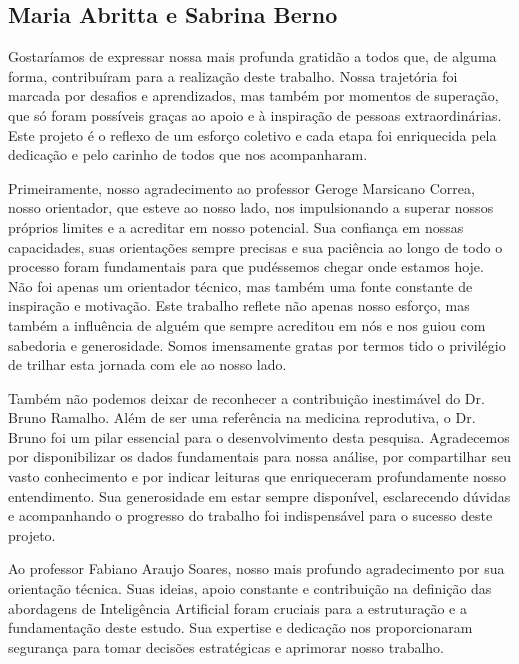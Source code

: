 \begin{agradecimentos}

\section*{Maria Abritta e Sabrina Berno}

Gostaríamos de expressar nossa mais profunda gratidão a todos que, de alguma forma, contribuíram para a realização deste trabalho. Nossa trajetória foi marcada por desafios e aprendizados, mas também por momentos de superação, que só foram possíveis graças ao apoio e à inspiração de pessoas extraordinárias. Este projeto é o reflexo de um esforço coletivo e cada etapa foi enriquecida pela dedicação e pelo carinho de todos que nos acompanharam.

Primeiramente, nosso agradecimento ao professor Geroge Marsicano Correa, nosso orientador, que esteve ao nosso lado, nos impulsionando a superar nossos próprios limites e a acreditar em nosso potencial. Sua confiança em nossas capacidades, suas orientações sempre precisas e sua paciência ao longo de todo o processo foram fundamentais para que pudéssemos chegar onde estamos hoje. Não foi apenas um orientador técnico, mas também uma fonte constante de inspiração e motivação. Este trabalho reflete não apenas nosso esforço, mas também a influência de alguém que sempre acreditou em nós e nos guiou com sabedoria e generosidade. Somos imensamente gratas por termos tido o privilégio de trilhar esta jornada com ele ao nosso lado.

Também não podemos deixar de reconhecer a contribuição inestimável do Dr. Bruno Ramalho. Além de ser uma referência na medicina reprodutiva, o Dr. Bruno foi um pilar essencial para o desenvolvimento desta pesquisa. Agradecemos por disponibilizar os dados fundamentais para nossa análise, por compartilhar seu vasto conhecimento e por indicar leituras que enriqueceram profundamente nosso entendimento. Sua generosidade em estar sempre disponível, esclarecendo dúvidas e acompanhando o progresso do trabalho foi indispensável para o sucesso deste projeto.

Ao professor Fabiano Araujo Soares, nosso mais profundo agradecimento por sua orientação técnica. Suas ideias, apoio constante e contribuição na definição das abordagens de Inteligência Artificial foram cruciais para a estruturação e a fundamentação deste estudo. Sua expertise e dedicação nos proporcionaram segurança para tomar decisões estratégicas e aprimorar nosso trabalho.


\end{agradecimentos}
